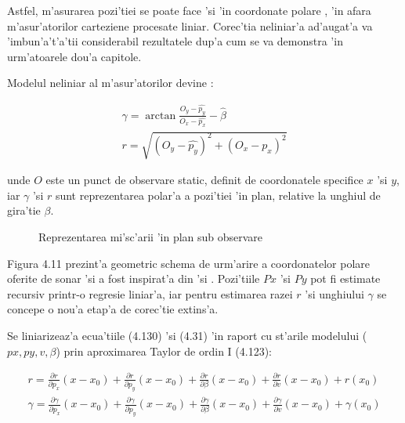 \documentclass[12pt,a4paper,twoside]{report}
\begin{document}
\vspace{5px}

Astfel, m'asurarea pozi'tiei se poate face 'si 'in coordonate polare \cite{SDhorizon}, 'in afara m'asur'atorilor carteziene procesate liniar. Corec'tia neliniar'a ad'augat'a va 'imbun'a't'a'tii considerabil rezultatele dup'a cum se va demonstra 'in urm'atoarele dou'a capitole.

\vspace{5px}

Modelul neliniar al m'asur'atorilor devine \cite{SDhorizon} \cite{RangeBear} \cite{Simulink}:

\begin{gather}
    \gamma = \arctan{\frac{O_y - \hat{p_y}}{{O_x} - \hat{p_x}}} - \hat \beta \\
    r = \sqrt{(O_y - \hat{p_y})^2 + (O_x - \hat{p_x})^2 }
\end{gather}

unde $O$ este un punct de observare static, definit de coordonatele specifice $x$ 'si $y$, iar $\gamma$ 'si $r$ sunt reprezentarea polar'a a pozi'tiei 'in plan, relative la unghiul de gira'tie $\beta$.

\begin{figure}[h]
\centering
  
  \caption{Reprezentarea mi'sc'arii 'in plan sub observare}
\end{figure}


Figura 4.11 prezint'a geometric schema de urm'arire a coordonatelor polare oferite de sonar 'si a fost inspirat'a din \cite{lidar} 'si \cite{Simulink}. Pozi'tiile $Px$ 'si $Py$ pot fi estimate recursiv printr-o regresie liniar'a, iar pentru estimarea razei $r$ 'si unghiului $\gamma$ se concepe o nou'a etap'a de corec'tie extins'a. 

Se liniarizeaz'a ecua'tiile (4.130) 'si (4.31) 'in raport cu st'arile modelului ($px,py,v,\beta$) prin aproximarea Taylor de ordin I (4.123):

\begin{gather}
r = \frac{\partial r}{\partial p_x} (x-x_0) +  \frac{\partial r}{\partial p_y} (x-x_0) +  \frac{\partial r}{\partial \beta} (x-x_0) +  \frac{\partial r}{\partial v} (x-x_0) + r (x_0) \\ 
\gamma = \frac{\partial \gamma}{\partial p_x} (x-x_0) +  \frac{\partial \gamma}{\partial p_y} (x-x_0) +  \frac{\partial \gamma}{\partial \beta} (x-x_0) +  \frac{\partial \gamma}{\partial v} (x-x_0) + \gamma (x_0) \\
\end{gather}
\end{document}
